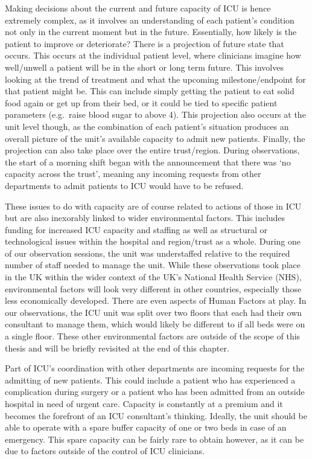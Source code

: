 \documentclass[a4paper, nobind]{templates/ociamthesis}
\begin{document}
Making decisions about the current and future capacity of ICU is hence extremely complex, as it involves an understanding of each patient's condition not only in the current moment but in the future. Essentially, how likely is the patient to improve or deteriorate? There is a projection of future state that occurs. This occurs at the individual patient level, where clinicians imagine how well/unwell a patient will be in the short or long term future. This involves looking at the trend of treatment and what the upcoming milestone/endpoint for that patient might be. This can include simply getting the patient to eat solid food again or get up from their bed, or it could be tied to specific patient parameters (e.g.~raise blood sugar to above 4). This projection also occurs at the unit level though, as the combination of each patient's situation produces an overall picture of the unit's available capacity to admit new patients. Finally, the projection can also take place over the entire trust/region. During observations, the start of a morning shift began with the announcement that there was `no capacity across the trust', meaning any incoming requests from other departments to admit patients to ICU would have to be refused.

These issues to do with capacity are of course related to actions of those in ICU but are also inexorably linked to wider environmental factors. This includes funding for increased ICU capacity and staffing as well as structural or technological issues within the hospital and region/trust as a whole. During one of our observation sessions, the unit was understaffed relative to the required number of staff needed to manage the unit. While these observations took place in the UK within the wider context of the UK's National Health Service (NHS), environmental factors will look very different in other countries, especially those less economically developed. There are even aspects of Human Factors at play. In our observations, the ICU unit was split over two floors that each had their own consultant to manage them, which would likely be different to if all beds were on a single floor. These other environmental factors are outside of the scope of this thesis and will be briefly revisited at the end of this chapter.

Part of ICU's coordination with other departments are incoming requests for the admitting of new patients. This could include a patient who has experienced a complication during surgery or a patient who has been admitted from an outside hospital in need of urgent care. Capacity is constantly at a premium and it becomes the forefront of an ICU consultant's thinking. Ideally, the unit should be able to operate with a spare buffer capacity of one or two beds in case of an emergency. This spare capacity can be fairly rare to obtain however, as it can be due to factors outside of the control of ICU clinicians.
\end{document}
